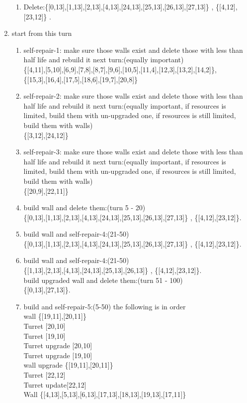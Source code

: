\documentclass[12pt]{article}
\begin{document}
\begin{enumerate}
\begin{enumerate}
\item Delete:\{[0,13],[1,13],[2,13],[4,13],[24,13],[25,13],[26,13],[27,13]\} , \{[4,12],[23,12]\} .
\end{enumerate}
     \item start from this turn 
\begin{enumerate}
\item self-repair-1: make sure those walls exist and delete those with less than half life and rebuild it next turn:(equally important)\\ \{[4,11],[5,10],[6,9],[7,8],[8,7],[9,6],[10,5],[11,4],[12,3],[13,2],[14,2]\},\\\{[15,3],[16,4],[17,5],[18,6],[19,7],[20,8]\}
\item self-repair-2: make sure those walls exist and delete those with less than half life and rebuild it next turn:(equally important, if resources is limited, build them with un-upgraded one, if resources is still limited, build them with walls)\\ \{[3,12],[24,12]\}
\item self-repair-3: make sure those walls exist and delete those with less than half life and rebuild it next turn:(equally important, if resources is limited, build them with un-upgraded one, if resources is still limited, build them with walls)\\ \{[20,9],[22,11]\}
\item build wall and delete them:(turn 5 - 20)\\ \{[0,13],[1,13],[2,13],[4,13],[24,13],[25,13],[26,13],[27,13]\} , \{[4,12],[23,12]\}.
\item build wall and self-repair-4:(21-50)\\ \{[0,13],[1,13],[2,13],[4,13],[24,13],[25,13],[26,13],[27,13]\} , \{[4,12],[23,12]\}.
\item build wall and self-repair-4:(21-50)\\ \{[1,13],[2,13],[4,13],[24,13],[25,13],[26,13]\} , \{[4,12],[23,12]\}. \\build upgraded wall and delete them:(turn 51 - 100)\\ \{[0,13],[27,13]\}.
\item build and self-repair-5:(5-50) the following is in order\\ wall \{[19,11],[20,11]\}\\ Turret [20,10] \\ Turret [19,10] \\ Turret upgrade [20,10] \\ Turret upgrade [19,10] \\ wall upgrade \{[19,11],[20,11]\}\\ Turret [22,12]\\ Turret update[22,12]\\ Wall \{[4,13],[5,13],[6,13],[17,13],[18,13],[19,13],[17,11]\}
\end{enumerate}
\end{enumerate}
\end{document}
